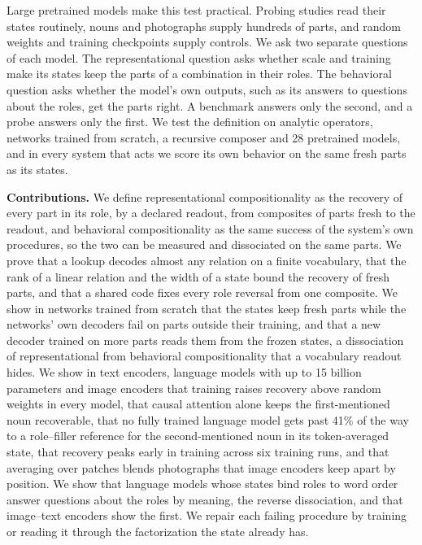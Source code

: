 \documentclass[10pt]{article}
\theoremstyle{plain}
\theoremstyle{remark}
\begin{document}
Large pretrained models make this test practical. Probing studies read their states routinely, nouns and photographs supply hundreds of parts, and random weights and training checkpoints supply controls. We ask two separate questions of each model. The representational question asks whether scale and training make its states keep the parts of a combination in their roles. The behavioral question asks whether the model's own outputs, such as its answers to questions about the roles, get the parts right. A benchmark answers only the second, and a probe answers only the first. We test the definition on analytic operators, networks trained from scratch, a recursive composer and 28 pretrained models, and in every system that acts we score its own behavior on the same fresh parts as its states.

\textbf{Contributions.} We define representational compositionality as the recovery of every part in its role, by a declared readout, from composites of parts fresh to the readout, and behavioral compositionality as the same success of the system's own procedures, so the two can be measured and dissociated on the same parts. We prove that a lookup decodes almost any relation on a finite vocabulary, that the rank of a linear relation and the width of a state bound the recovery of fresh parts, and that a shared code fixes every role reversal from one composite. We show in networks trained from scratch that the states keep fresh parts while the networks' own decoders fail on parts outside their training, and that a new decoder trained on more parts reads them from the frozen states, a dissociation of representational from behavioral compositionality that a vocabulary readout hides. We show in text encoders, language models with up to 15 billion parameters and image encoders that training raises recovery above random weights in every model, that causal attention alone keeps the first-mentioned noun recoverable, that no fully trained language model gets past 41\% of the way to a role--filler reference for the second-mentioned noun in its token-averaged state, that recovery peaks early in training across six training runs, and that averaging over patches blends photographs that image encoders keep apart by position. We show that language models whose states bind roles to word order answer questions about the roles by meaning, the reverse dissociation, and that image--text encoders show the first. We repair each failing procedure by training or reading it through the factorization the state already has.
\end{document}
